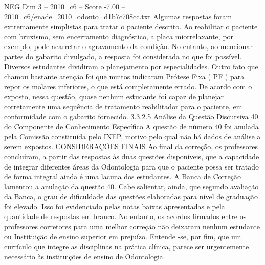 \begin{textsample}{NEG Dim 3 – 2010\_c6 – Score -7.00 – 2010\_c6/enade\_2010\_odonto\_d1b7c708cc.txt}
Algumas respostas foram extremamente simplistas para tratar o paciente descrito.
Ao reabilitar o paciente com bruxismo, sem encerramento diagnóstico, a placa miorrelaxante, por exemplo, pode acarretar o agravamento da condição.
No entanto, ao mencionar partes do gabarito divulgado, a resposta foi considerada no que foi possível.
Diversos estudantes dividiram o planejamento por especialidades.
Outro fato que chamou bastante atenção foi que muitos indicaram Prótese Fixa ( PF ) para repor os molares inferiores, o que está completamente errado.
De acordo com o exposto, nessa questão, quase nenhum estudante foi capaz de planejar corretamente uma sequência de tratamento reabilitador para o paciente, em conformidade com o gabarito fornecido. 3.3.2.5 Análise da Questão Discursiva 40 do Componente de Conhecimento Específico A questão de número 40 foi anulada pela Comissão constituída pelo INEP, motivo pelo qual não há dados de análise a serem expostos.
CONSIDERAÇÕES FINAIS Ao final da correção, os professores concluíram, a partir das respostas às duas questões disponíveis, que a capacidade de integrar diferentes áreas da Odontologia para que o paciente possa ser tratado de forma integral ainda é uma lacuna dos estudantes.
A Banca de Correção lamentou a anulação da questão 40.
Cabe salientar, ainda, que segundo avaliação da Banca, o grau de dificuldade das questões elaboradas para nível de graduação foi elevado.
Isso foi evidenciado pelas notas baixas apresentadas e pela quantidade de respostas em branco.
No entanto, os acordos firmados entre os professores corretores para uma melhor correção não deixaram nenhum estudante ou Instituição de ensino superior em prejuízo.
Entende -se, por fim, que um currículo que integre as disciplinas na prática clínica, parece ser urgentemente necessário às instituições de ensino de Odontologia.

\end{textsample}
